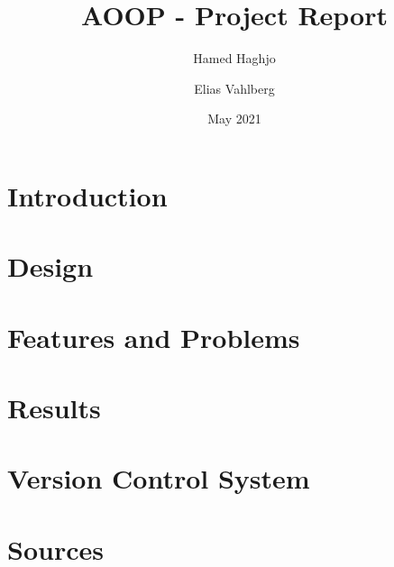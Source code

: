 \documentclass{article}
\title{AOOP - Project Report}
\author{Hamed Haghjo \and Elias Vahlberg}
\date{May 2021}
\begin{document}
\maketitle
\tableofcontents
\newpage
\section{Introduction}

\newpage
\section{Design}
\newpage


\newpage
\section{Features and Problems}


\newpage
\section{Results}

\newpage
\section{Version Control System}


\newpage
\section{Sources}
\end{document}
